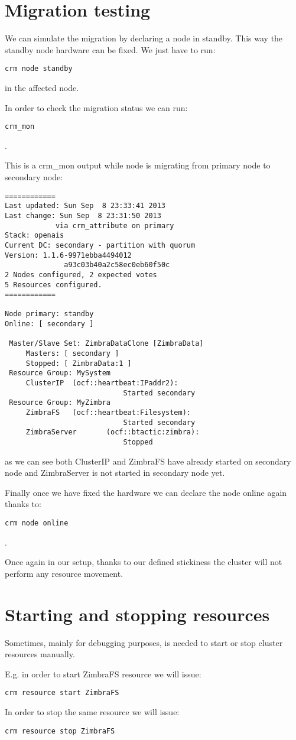 \section {Migration testing}
We can simulate the migration by declaring a node in standby. This way the standby node hardware can be fixed. We just have to run:
\begin{verbatim}
crm node standby
\end{verbatim}
in the affected node.

In order to check the migration status we can run:
\begin{verbatim}
crm_mon
\end{verbatim}
.

This is a crm\_mon output while node is migrating from primary node to secondary node:
\begin{verbatim}
============
Last updated: Sun Sep  8 23:33:41 2013
Last change: Sun Sep  8 23:31:50 2013
            via crm_attribute on primary
Stack: openais
Current DC: secondary - partition with quorum
Version: 1.1.6-9971ebba4494012
              a93c03b40a2c58ec0eb60f50c
2 Nodes configured, 2 expected votes
5 Resources configured.
============

Node primary: standby
Online: [ secondary ]

 Master/Slave Set: ZimbraDataClone [ZimbraData]
     Masters: [ secondary ]
     Stopped: [ ZimbraData:1 ]
 Resource Group: MySystem
     ClusterIP  (ocf::heartbeat:IPaddr2):
                            Started secondary
 Resource Group: MyZimbra
     ZimbraFS   (ocf::heartbeat:Filesystem):
                            Started secondary
     ZimbraServer       (ocf::btactic:zimbra):
                            Stopped
\end{verbatim}
as we can see both ClusterIP and ZimbraFS have already started on secondary node and ZimbraServer is not started in secondary node yet.


Finally once we have fixed the hardware we can declare the node online again thanks to:
\begin{verbatim}
crm node online
\end{verbatim}
.

Once again in our setup, thanks to our defined stickiness the cluster will not perform any resource movement.

\section {Starting and stopping resources}
Sometimes, mainly for debugging purposes, is needed to start or stop cluster resources manually.

E.g. in order to start ZimbraFS resource we will issue:
\begin{verbatim}
crm resource start ZimbraFS
\end{verbatim}
In order to stop the same resource we will issue:
\begin{verbatim}
crm resource stop ZimbraFS
\end{verbatim}

